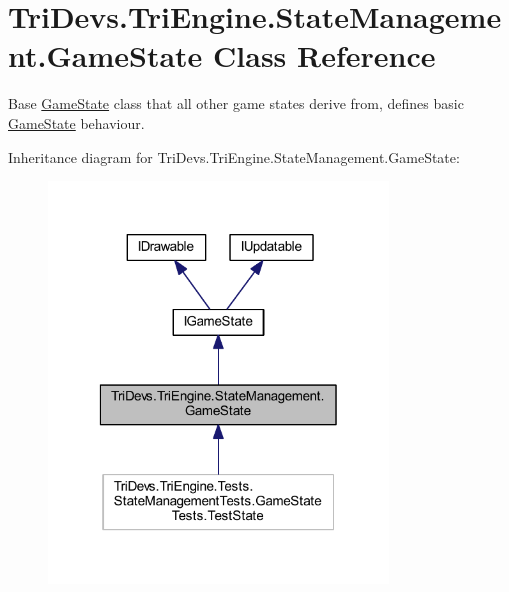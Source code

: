 \hypertarget{class_tri_devs_1_1_tri_engine_1_1_state_management_1_1_game_state}{\section{Tri\-Devs.\-Tri\-Engine.\-State\-Management.\-Game\-State Class Reference}
\label{class_tri_devs_1_1_tri_engine_1_1_state_management_1_1_game_state}
}


Base \hyperlink{class_tri_devs_1_1_tri_engine_1_1_state_management_1_1_game_state}{Game\-State} class that all other game states derive from, defines basic \hyperlink{class_tri_devs_1_1_tri_engine_1_1_state_management_1_1_game_state}{Game\-State} behaviour.  




Inheritance diagram for Tri\-Devs.\-Tri\-Engine.\-State\-Management.\-Game\-State\-:
\nopagebreak
\begin{figure}[H]
\begin{center}
\leavevmode
\includegraphics[width=256pt]{class_tri_devs_1_1_tri_engine_1_1_state_management_1_1_game_state__inherit__graph}
\end{center}
\end{figure}


